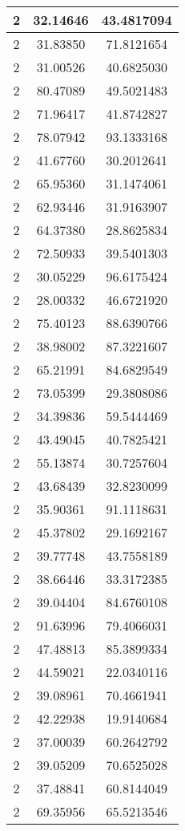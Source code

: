 \documentclass[
]{book}
\begin{document}
\begin{tabular}{c|c|c}
\hline
2 & 32.14646 & 43.4817094\\
\hline
2 & 31.83850 & 71.8121654\\
\hline
2 & 31.00526 & 40.6825030\\
\hline
2 & 80.47089 & 49.5021483\\
\hline
2 & 71.96417 & 41.8742827\\
\hline
2 & 78.07942 & 93.1333168\\
\hline
2 & 41.67760 & 30.2012641\\
\hline
2 & 65.95360 & 31.1474061\\
\hline
2 & 62.93446 & 31.9163907\\
\hline
2 & 64.37380 & 28.8625834\\
\hline
2 & 72.50933 & 39.5401303\\
\hline
2 & 30.05229 & 96.6175424\\
\hline
2 & 28.00332 & 46.6721920\\
\hline
2 & 75.40123 & 88.6390766\\
\hline
2 & 38.98002 & 87.3221607\\
\hline
2 & 65.21991 & 84.6829549\\
\hline
2 & 73.05399 & 29.3808086\\
\hline
2 & 34.39836 & 59.5444469\\
\hline
2 & 43.49045 & 40.7825421\\
\hline
2 & 55.13874 & 30.7257604\\
\hline
2 & 43.68439 & 32.8230099\\
\hline
2 & 35.90361 & 91.1118631\\
\hline
2 & 45.37802 & 29.1692167\\
\hline
2 & 39.77748 & 43.7558189\\
\hline
2 & 38.66446 & 33.3172385\\
\hline
2 & 39.04404 & 84.6760108\\
\hline
2 & 91.63996 & 79.4066031\\
\hline
2 & 47.48813 & 85.3899334\\
\hline
2 & 44.59021 & 22.0340116\\
\hline
2 & 39.08961 & 70.4661941\\
\hline
2 & 42.22938 & 19.9140684\\
\hline
2 & 37.00039 & 60.2642792\\
\hline
2 & 39.05209 & 70.6525028\\
\hline
2 & 37.48841 & 60.8144049\\
\hline
2 & 69.35956 & 65.5213546\\

\end{tabular}
\end{document}
